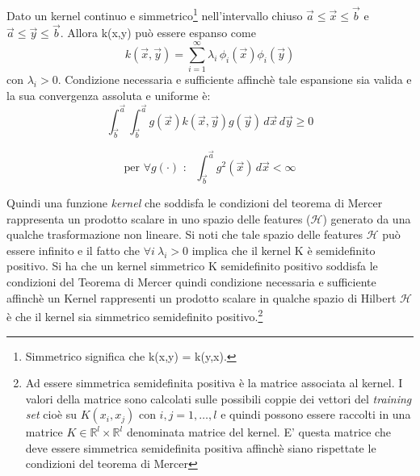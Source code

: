 \begin{teorema}Dato un kernel continuo e simmetrico\footnote{Simmetrico significa che k(x,y) = k(y,x).} nell'intervallo chiuso    $\overrightarrow{a} \leq \overrightarrow{x} \leq \overrightarrow{b}$ e $\overrightarrow{a} \leq \overrightarrow{y} \leq \overrightarrow{b}$. Allora k(x,y) può essere espanso come
\begin{equation}
k(\overrightarrow{x},\overrightarrow{y}) = \sum_{i=1}^{\infty}\lambda_i\,\phi_i(\overrightarrow{x})\phi_i(\overrightarrow{y})
\end{equation}
con $\lambda_i > 0$. Condizione necessaria e sufficiente affinchè tale espansione sia valida e la sua convergenza assoluta e uniforme è:
\begin{equation*}
\int_{\overrightarrow{b}}^{\overrightarrow{a}}\int_{\overrightarrow{b}}^{\overrightarrow{a}} g(\overrightarrow{x})k(\overrightarrow{x},\overrightarrow{y})g(\overrightarrow{y})\,d\overrightarrow{x}\,d\overrightarrow{y} \geq 0
\end{equation*}

\begin{equation*}
\text{per } \forall g(\cdot) \text{ : } \:\:\int_{\overrightarrow{b}}^{\overrightarrow{a}}g^2(\overrightarrow{x})\,d\overrightarrow{x} < \infty
\end{equation*}
\end{teorema}

Quindi una funzione \textit{kernel} che soddisfa le condizioni del teorema di Mercer rappresenta un prodotto scalare in uno spazio delle features ($\mathcal{H}$) generato da una qualche trasformazione non lineare. Si noti che tale spazio delle features $\mathcal{H}$ può essere infinito e il fatto che $\forall i \:\lambda_i > 0$ implica che il kernel K è semidefinito positivo. Si ha che un kernel simmetrico K semidefinito positivo soddisfa le condizioni del Teorema di Mercer quindi condizione necessaria e sufficiente affinchè un Kernel rappresenti un prodotto scalare in qualche spazio di Hilbert $\mathcal{H}$ è che il kernel sia simmetrico semidefinito positivo.\footnote{\label{note:hessiano}Ad essere simmetrica semidefinita positiva è la matrice associata al kernel. I valori della matrice sono calcolati sulle possibili coppie dei vettori del \textit{training set} cioè su $K(x_i,x_j) \text{ con } i,j=1,\dots,l$ e quindi possono essere raccolti in una matrice $K \in \mathbb{R}^l \times \mathbb{R}^l$ denominata matrice del kernel. E' questa matrice che deve essere simmetrica semidefinita positiva affinchè siano rispettate le condizioni del teorema di Mercer} 

